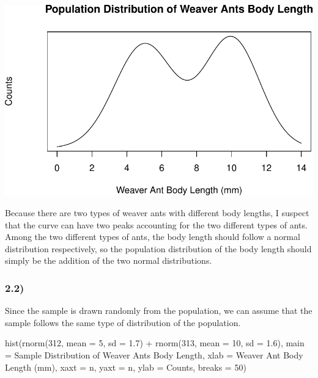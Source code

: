 \documentclass[
]{article}
\newenvironment{Shaded}{\begin{snugshade}}{\end{snugshade}}
\newcommand{\AttributeTok}[1]{\textcolor[rgb]{0.77,0.63,0.00}{#1}}
\newcommand{\DecValTok}[1]{\textcolor[rgb]{0.00,0.00,0.81}{#1}}
\newcommand{\FloatTok}[1]{\textcolor[rgb]{0.00,0.00,0.81}{#1}}
\newcommand{\FunctionTok}[1]{\textcolor[rgb]{0.00,0.00,0.00}{#1}}
\newcommand{\NormalTok}[1]{#1}
\newcommand{\SpecialCharTok}[1]{\textcolor[rgb]{0.00,0.00,0.00}{#1}}
\newcommand{\StringTok}[1]{\textcolor[rgb]{0.31,0.60,0.02}{#1}}
\begin{document}
\begin{center}\includegraphics{hw4_files/figure-latex/unnamed-chunk-3-1} \end{center}

Because there are two types of weaver ants with different body lengths,
I suspect that the curve can have two peaks accounting for the two
different types of ants. Among the two different types of ants, the body
length should follow a normal distribution respectively, so the
population distribution of the body length should simply be the addition
of the two normal distributions.

\hypertarget{section-4}{%
\subsubsection{2.2)}\label{section-4}}

Since the sample is drawn randomly from the population, we can assume
that the sample follows the same type of distribution of the population.

\begin{Shaded}
\begin{Highlighting}[]
\FunctionTok{hist}\NormalTok{(}\FunctionTok{rnorm}\NormalTok{(}\DecValTok{312}\NormalTok{, }\AttributeTok{mean =} \DecValTok{5}\NormalTok{, }\AttributeTok{sd =} \FloatTok{1.7}\NormalTok{) }\SpecialCharTok{+} \FunctionTok{rnorm}\NormalTok{(}\DecValTok{313}\NormalTok{, }\AttributeTok{mean =} \DecValTok{10}\NormalTok{, }\AttributeTok{sd =} \FloatTok{1.6}\NormalTok{),}
     \AttributeTok{main =} \StringTok{\textquotesingle{}Sample Distribution of Weaver Ants Body Length\textquotesingle{}}\NormalTok{,}
     \AttributeTok{xlab =} \StringTok{\textquotesingle{}Weaver Ant Body Length (mm)\textquotesingle{}}\NormalTok{, }\AttributeTok{xaxt =} \StringTok{\textquotesingle{}n\textquotesingle{}}\NormalTok{,}
     \AttributeTok{yaxt =} \StringTok{\textquotesingle{}n\textquotesingle{}}\NormalTok{, }\AttributeTok{ylab =} \StringTok{\textquotesingle{}Counts\textquotesingle{}}\NormalTok{,}
     \AttributeTok{breaks =} \DecValTok{50}\NormalTok{)}
\end{Highlighting}
\end{Shaded}
\end{document}
